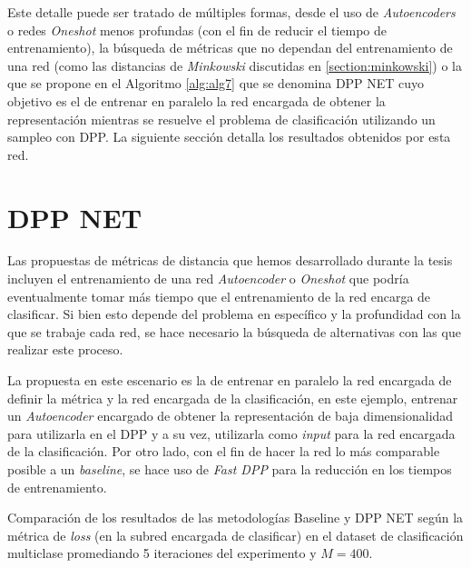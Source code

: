 \vspace{0.2cm}

Este detalle puede ser tratado de múltiples formas, desde el uso de \textit{Autoencoders} o redes \textit{Oneshot} menos profundas (con el fin de reducir el tiempo de entrenamiento), la búsqueda de métricas que no dependan del entrenamiento de una red (como las distancias de \textit{Minkowski} discutidas en \ref{section:minkowski}) o la que se propone en el Algoritmo \ref{alg:alg7} que se denomina DPP NET cuyo objetivo es el de entrenar en paralelo la red encargada de obtener la representación mientras se resuelve el problema de clasificación utilizando un sampleo con DPP. La siguiente sección detalla los resultados obtenidos por esta red. 


\section{DPP NET}

Las propuestas de métricas de distancia que hemos desarrollado durante la tesis incluyen el entrenamiento de una red \textit{Autoencoder} o \textit{Oneshot} que podría eventualmente tomar más tiempo que el entrenamiento de la red encarga de clasificar. Si bien esto depende del problema en específico y la profundidad con la que se trabaje cada red, se hace necesario la búsqueda de alternativas con las que realizar este proceso. 

\vspace{0.2cm}

La propuesta en este escenario es la de entrenar en paralelo la red encargada de definir la métrica y la red encargada de la clasificación, en este ejemplo, entrenar un \textit{Autoencoder} encargado de obtener la representación de baja dimensionalidad para utilizarla en el DPP y a su vez, utilizarla como \textit{input} para la red encargada de la clasificación. Por otro lado, con el fin de hacer la red lo más comparable posible a un \textit{baseline}, se hace uso de \textit{Fast DPP} para la reducción en los tiempos de entrenamiento.

\begin{images}[\label{fig:nd_dpp_net}]{\centering Comparación de los resultados de las metodologías Baseline y DPP NET según la métrica de \textit{loss} (en la subred encargada de clasificar) en el dataset de clasificación multiclase promediando 5 iteraciones del experimento y $M=400$.}
\end{images}



